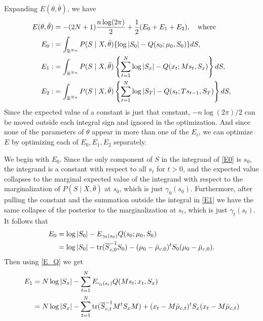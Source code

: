 \documentclass[12pt,leqno]{article}
\begin{document}
Expanding $E(\theta,\bar{\theta})$, we have 
\begin{align}
  E(\theta,\bar{\theta}) &= -(2N+1)\frac{n\log(2\pi)}{2} + \frac{1}{2}(E_0 + E_1 + E_2),\quad\text{where}\notag\\
  E_0 :&=\int_{{\mathbb R}^{Nn}}P(S\mid X,\bar{\theta})\{\log|S_0| - Q(s_0;\mu_0,S_0)\}dS,\label{E0}\\
  E_1 :&= \int_{{\mathbb R}^{Nn}}P(S\mid X,\bar{\theta})\left\{\sum_{t=1}^N\log|S_x| - Q(x_t;Ms_t,S_x)\right\}dS,
\label{E1}\\
E_2 :&= \int_{{\mathbb R}^{Nn}}P(S\mid X,\bar{\theta})\left\{\sum_{t=1}^N\log|S_T| - Q(s_t;Ts_{t-1},S_T)\right\}dS,
\label{E2}
\end{align}
Since the expected value of a constant is just that constant, $-n\log(2\pi)/2$ can be moved outside each
integral sign and ignored in the optimization.  And since none of the parameters of $\theta$ appear in more
than one of the $E_i$, we can optimize $E$ by optimizing each of $E_0,E_1,E_2$ separately.

We begin with $E_0$. Since the only component of $S$ in the integrand of \eqref{E0} is $s_0$, the integrand is a constant
with respect to all $s_t$ for $t > 0$, and the expected value
collapses to the marginal 
expected value of the integrand with respect to the marginalization of $P(S\mid X,\bar{\theta})$ at $s_0$, which is just 
$\gamma_0(s_0)$.  Furthermore, after pulling the constant and the summation 
outside the integral in \eqref{E1} we have the same collapse of the posterior to the marginalization at $s_t$,
which is just $\gamma_t(s_t)$.  It follows that
\begin{equation}  \label{E0:1}
  \begin{split}
  E_0 &= \log|S_0| - E_{\gamma_0(s_0)}Q(s_0;\mu_0,S_0)\\
  &=\log|S_0| - \text{\rm tr}(\overline{S}_{c,0}^{-1}S_0) - (\mu_0-\bar{\mu}_{c,0})^tS_0(\mu_0 - \bar{\mu}_{c,0}).
  \end{split}
  \end{equation}
Then using \eqref{E_Q} we get
\begin{equation}\label{E1:1}
  \begin{split}
  E_1 &= N\log|S_x| - \sum_{t=1}^NE_{\gamma_t(s_t)}Q(Ms_t;x_t,S_x)\\
  &= N\log|S_x| - \sum_{t=1}^N\text{\rm tr}(\overline{S}_{c,t}^{-1}M^tS_xM) + (x_t-M\bar{\mu}_{c,t})^tS_x(x_t-M\bar{\mu}_{c,t})
  \end{split}
\end{equation}
\end{document}
